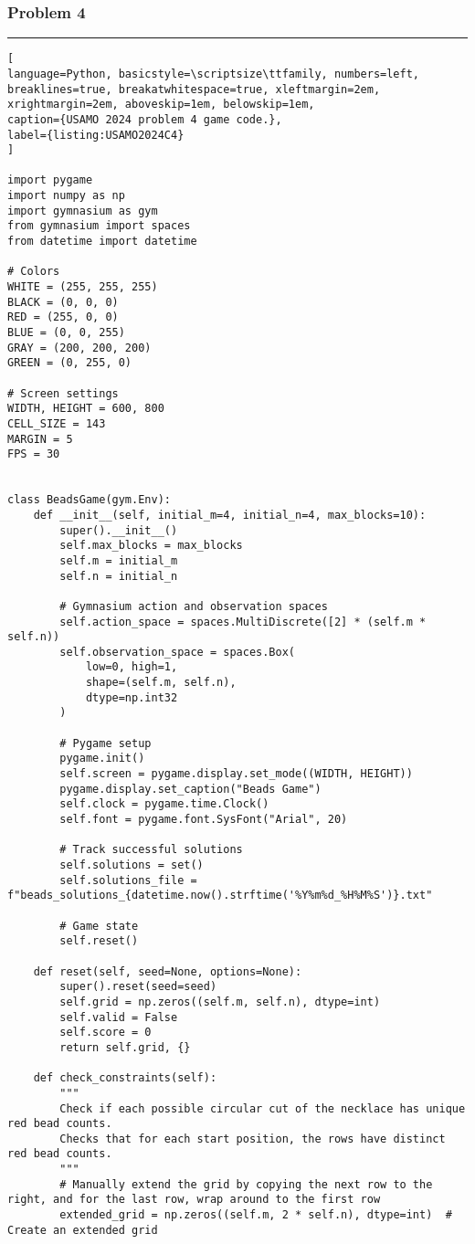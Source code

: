 \newpage
\clearpage

\subsubsection*{Problem 4}

\hrule
\begin{lstlisting}[
language=Python, basicstyle=\scriptsize\ttfamily, numbers=left, breaklines=true, breakatwhitespace=true, xleftmargin=2em, xrightmargin=2em, aboveskip=1em, belowskip=1em,
caption={USAMO 2024 problem 4 game code.},
label={listing:USAMO2024C4}
]

import pygame
import numpy as np
import gymnasium as gym
from gymnasium import spaces
from datetime import datetime

# Colors
WHITE = (255, 255, 255)
BLACK = (0, 0, 0)
RED = (255, 0, 0)
BLUE = (0, 0, 255)
GRAY = (200, 200, 200)
GREEN = (0, 255, 0)

# Screen settings
WIDTH, HEIGHT = 600, 800
CELL_SIZE = 143
MARGIN = 5
FPS = 30


class BeadsGame(gym.Env):
    def __init__(self, initial_m=4, initial_n=4, max_blocks=10):
        super().__init__()
        self.max_blocks = max_blocks
        self.m = initial_m
        self.n = initial_n

        # Gymnasium action and observation spaces
        self.action_space = spaces.MultiDiscrete([2] * (self.m * self.n))
        self.observation_space = spaces.Box(
            low=0, high=1,
            shape=(self.m, self.n),
            dtype=np.int32
        )

        # Pygame setup
        pygame.init()
        self.screen = pygame.display.set_mode((WIDTH, HEIGHT))
        pygame.display.set_caption("Beads Game")
        self.clock = pygame.time.Clock()
        self.font = pygame.font.SysFont("Arial", 20)

        # Track successful solutions
        self.solutions = set()
        self.solutions_file = f"beads_solutions_{datetime.now().strftime('%Y%m%d_%H%M%S')}.txt"

        # Game state
        self.reset()

    def reset(self, seed=None, options=None):
        super().reset(seed=seed)
        self.grid = np.zeros((self.m, self.n), dtype=int)
        self.valid = False
        self.score = 0
        return self.grid, {}

    def check_constraints(self):
        """
        Check if each possible circular cut of the necklace has unique red bead counts.
        Checks that for each start position, the rows have distinct red bead counts.
        """
        # Manually extend the grid by copying the next row to the right, and for the last row, wrap around to the first row
        extended_grid = np.zeros((self.m, 2 * self.n), dtype=int)  # Create an extended grid


\end{lstlisting}
